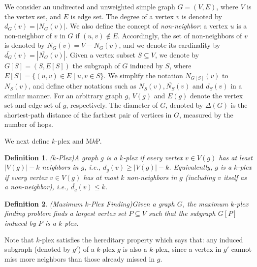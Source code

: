 \documentclass[sigconf,anonymous,review]{acmart}
\newtheorem{definition}{Definition}
\begin{document}
We consider an undirected and unweighted simple graph $G=(V, E)$, where $V$ is the vertex set, and $E$ is edge set. The degree of a vertex $v$ is denoted by $d_G(v)=|N_G(v)|$. 
We also define the concept of {\em non-neighbor}: a vertex $u$ is a non-neighbor of $v$ in $G$ if $(u, v)\not\in E$. Accordingly, the set of non-neighbors of $v$ is denoted by $\overline{N_G}(v)=V- N_G(v)$, and we denote its cardinality by $\overline{d_G}(v)=|\overline{N_G}(v)|$.
Given a vertex subset $S\subseteq V$, we denote by $G[S]=(S, E[S])$ the subgraph of $G$ induced by $S$, where $E[S]=\{(u,v)\in E\mid u,v\in S\}$. We simplify the notation $N_{G[S]}(v)$ to $N_S(v)$, and define other notations such as $N_S(v), \overline{N_S}(v)$ and $d_S(v)$ in a similar manner. For an arbitrary graph $g$, $V(g)$ and $E(g)$ denote the vertex set and edge set of $g$, respectively. 
The diameter of $G$, denoted by $\Delta(G)$ is the shortest-path distance of the farthest pair of vertices in $G$, measured by the number of hops.

\vspace{1mm}
 We next define $k$-plex and M$k$P.

\vspace{-1mm}
\begin{definition}(\emph{$k$-Plex})\label{def:kplex}
    A graph $g$ is a $k$-plex if every vertex $v\in V(g)$ has at least $|V(g)|-k$ neighbors in $g$, i.e., $d_g(v)\ge |V(g)|-k$. Equivalently, $g$ is a $k$-plex if every vertex $v\in V(g)$ has at most $k$ non-neighbors in $g$ (including $v$ itself as a non-neighbor), i.e., $\overline{d_g}(v)\le k$.
\end{definition}

\vspace{-2mm}
\begin{definition}(\emph{Maximum $k$-Plex Finding})\label{def:MkP}
  Given a graph $G$, the maximum $k$-plex finding problem finds a largest vertex set $P\subseteq V$ such that the subgraph $G[P]$ induced by $P$ is a $k$-plex. 
\end{definition}
\vspace{-1mm}

\vspace{1mm}
Note that $k$-plex satisfies the hereditary property which says that: any induced subgraph (denoted by $g'$) of a $k$-plex $g$ is also a $k$-plex, since a vertex in $g'$ cannot miss more neighbors than those already missed in $g$.
\end{document}
